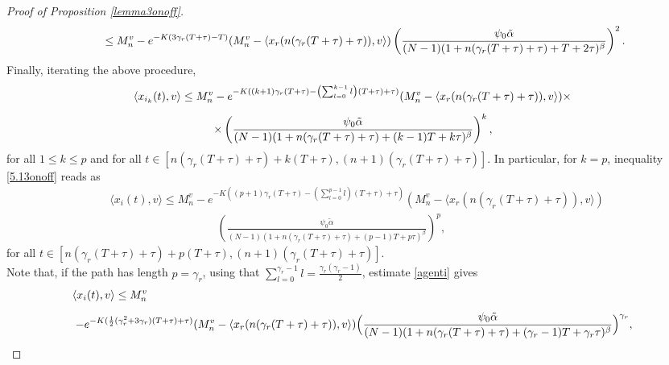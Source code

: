 \documentclass[11pt]{article}
\begin{document}
\begin{proof}[Proof of Proposition \ref{lemma3onoff}]
\begin{equation}
\begin{array}{l}
				\displaystyle{\hspace{0.8cm}\leq M^v_n-e^{-K(3\gamma_r (T+\tau)-T)}(M_n^v-\langle x_r(n(\gamma_r(T+\tau)+\tau)),v \rangle)\left(\frac{\psi_0\tilde{\alpha}}{(N-1)(1+n(\gamma_r(T+\tau)+\tau)+T+2\tau)^\beta}\right)^2.}
			\end{array}
		\end{equation}
		Finally, iterating the above procedure,
		\begin{equation} \label{5.13onoff}
			\begin{array}{l}
				\vspace{0.3cm}\displaystyle{\langle x_{i_k}(t),v\rangle \leq M^v_{n}-e^{- K((k+1)\gamma_r(T+\tau) -\left(\sum_{l=0}^{k-1}l\right)(T+\tau)+\tau)} (M_n^v-\langle x_r(n(\gamma_r(T+\tau)+\tau)),v \rangle)\times}\\
				\displaystyle{\hspace{2.5cm}\times\left(\frac{\psi_{0}\tilde{\alpha}}{(N-1)(1+n(\gamma_r(T+\tau)+\tau)+(k-1)T+k\tau)^\beta}\right)^{k},}
			\end{array}
		\end{equation}
		for all $1\leq k\leq p$ and for all $t\in [n(\gamma_r (T+\tau)+\tau)+k(T+\tau),(n+1)(\gamma_r (T+\tau)+\tau)]$. In particular, for $k=p$, inequality \eqref{5.13onoff} reads as
        \begin{equation}\label{agenti}
        \begin{split}
           & \langle x_{i}(t),v\rangle \leq M^v_{n}-e^{- K((p+1)\gamma_r(T+\tau) -\left(\sum_{l=0}^{p-1}l\right)(T+\tau)+\tau)} (M_n^v-\langle x_r(n(\gamma_r(T+\tau)+\tau)),v \rangle) \\
           & \hspace{4cm}\left(\frac{\psi_{0}\tilde{\alpha}}{(N-1)(1+n(\gamma_r(T+\tau)+\tau)+(p-1)T+p\tau)^\beta}\right)^{p},
            \end{split}
        \end{equation} 
        for all $t\in [n(\gamma_r (T+\tau)+\tau)+p(T+\tau),(n+1)(\gamma_r (T+\tau)+\tau)]$.
        \\Note that, if the path has length $p=\gamma_r$, using that $\sum_{l=0}^{\gamma_r-1}l=\frac{\gamma_r(\gamma_r-1)}{2}$, estimate \eqref{agenti} gives
		\begin{equation}\label{5.13gammaonoff}
        \begin{array}{l}
        	\vspace{0.3cm}\displaystyle{\langle x_{i}(t),v\rangle \leq M^v_{n}}\\
        	\displaystyle{\hspace{0.1cm}-e^{-K (\frac{1}{2}(\gamma_{r}^2+3\gamma_r)(T+\tau)+\tau)}(M_n^v-\langle x_r(n(\gamma_r(T+\tau)+\tau)),v \rangle)\Big(\frac{\psi_{0}\tilde{\alpha}}{(N-1)(1+n(\gamma_r(T+\tau)+\tau)+(\gamma_r-1)T+\gamma_r\tau)^\beta}\Big)^{\gamma_r},}

\end{array}
\end{equation}
\end{proof}
\end{document}
